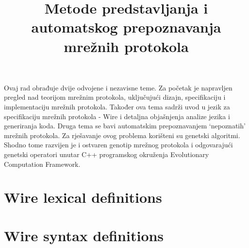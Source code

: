 \documentclass[times, utf8, diplomski]{fer}
\begin{document}
\title{Metode predstavljanja i automatskog prepoznavanja mrežnih protokola}
\begin{sazetak}
Ovaj rad obrađuje dvije odvojene i nezavisne teme. Za početak je napravljen pregled 
nad teorijom mrežnim protokola, uključujući dizajn, specifikaciju i implementaciju
mrežnih protokola. Također ova tema sadrži uvod u jezik za specifikaciju mrežnih protokola 
- Wire i detaljna objašnjenja analize jezika i generiranja koda. Druga tema
se bavi automatskim prepoznavanjem `nepoznatih' mrežnih protokola. Za rješavanje
ovog problema korišteni su genetski algoritmi. Shodno tome razvijen je i ostvaren
genotip mrežnog protokola i odgovarajući genetski operatori unutar C++ programskog 
okruženja Evolutionary Computation Framework.

\end{sazetak}

\appendix
\chapter{Wire lexical definitions}
\lstset{language=C}
\lstset{basicstyle=\tiny}
\lstset{numbers=left, numberstyle=\tiny, stepnumber=1, numbersep=5pt}


\chapter{Wire syntax definitions}
\lstset{language=C}
\lstset{basicstyle=\tiny}
\lstset{numbers=left, numberstyle=\tiny, stepnumber=1, numbersep=5pt}

\end{document}
